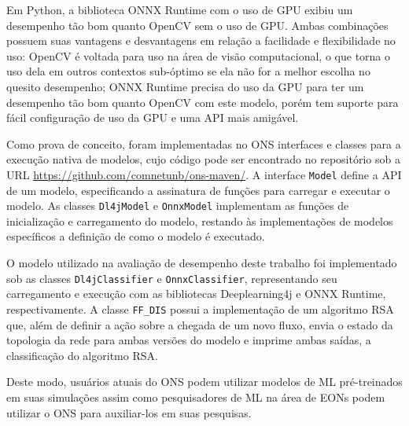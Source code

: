 Em Python, a biblioteca ONNX Runtime com o uso de GPU exibiu um desempenho tão bom quanto OpenCV sem o uso de GPU. Ambas combinações possuem suas vantagens e desvantagens em relação a facilidade e flexibilidade no uso: OpenCV é voltada para uso na área de visão computacional, o que torna o uso dela em outros contextos sub-óptimo se ela não for a melhor escolha no quesito desempenho; ONNX Runtime precisa do uso da GPU para ter um desempenho tão bom quanto OpenCV com este modelo, porém tem suporte para fácil configuração de uso da GPU e uma API mais amigável.

Como prova de conceito, foram implementadas no \acrfull{ONS} interfaces e classes para a execução nativa de modelos, cujo código pode ser encontrado no repositório sob a URL \url{https://github.com/comnetunb/ons-maven/}. A interface \texttt{Model} define a API de um modelo, especificando a assinatura de funções para carregar e executar o modelo. As classes \texttt{Dl4jModel} e \texttt{OnnxModel} implementam as funções de inicialização e carregamento do modelo, restando às implementações de modelos específicos a definição de como o modelo é executado.

O modelo utilizado na avaliação de desempenho deste trabalho foi implementado sob as classes \texttt{Dl4jClassifier} e \texttt{OnnxClassifier}, representando seu carregamento e execução com as bibliotecas Deeplearning4j e ONNX Runtime, respectivamente. A classe \texttt{FF\_DIS} possui a implementação de um algoritmo RSA que, além de definir a ação sobre a chegada de um novo fluxo, envia o estado da topologia da rede para ambas versões do modelo e imprime ambas saídas, a classificação do algoritmo RSA.

Deste modo, usuários atuais do ONS podem utilizar modelos de ML pré-treinados em suas simulações assim como pesquisadores de ML na área de EONs podem utilizar o ONS para auxiliar-los em suas pesquisas.